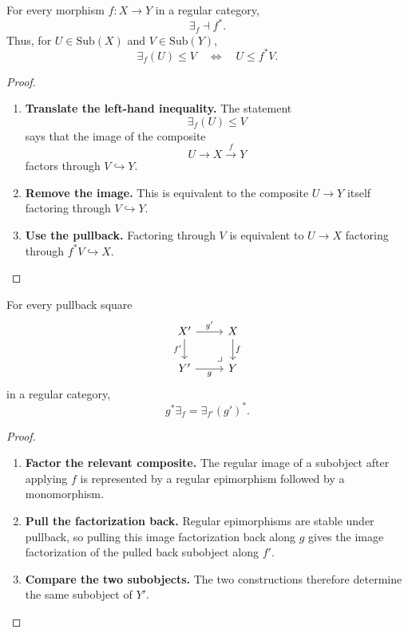 \begin{proposition}
\label{prop:relative-existential-adjunction}
For every morphism \(f:X\to Y\) in a regular category,
\[
\exists_f\dashv f^\ast.
\]
Thus, for \(U\in\mathrm{Sub}(X)\) and \(V\in\mathrm{Sub}(Y)\),
\[
\exists_f(U)\le V
\quad\Longleftrightarrow\quad
U\le f^\ast V.
\]
\end{proposition}

\begin{proof}
\leavevmode
\begin{enumerate}
\item \textbf{Translate the left-hand inequality.}
The statement
\[
\exists_f(U)\le V
\]
says that the image of the composite
\[
U\to X\xrightarrow{f}Y
\]
factors through \(V\hookrightarrow Y\).

\item \textbf{Remove the image.}
This is equivalent to the composite \(U\to Y\) itself factoring through
\(V\hookrightarrow Y\).

\item \textbf{Use the pullback.}
Factoring through \(V\) is equivalent to \(U\to X\) factoring through
\(f^\ast V\hookrightarrow X\).
\end{enumerate}
\end{proof}

\begin{proposition}
\label{prop:relative-regular-beck-chevalley}
For every pullback square
\[
\begin{tikzcd}
X' \arrow[r,"g'"] \arrow[d,"f'"']
&
X \arrow[d,"f"]
\\
Y' \arrow[r,"g"']
&
Y
\arrow[ul,phantom,very near start,"\lrcorner"]
\end{tikzcd}
\]
in a regular category,
\[
g^\ast\exists_f=\exists_{f'}(g')^\ast.
\]
\end{proposition}

\begin{proof}
\leavevmode
\begin{enumerate}
\item \textbf{Factor the relevant composite.}
The regular image of a subobject after applying \(f\) is represented by a
regular epimorphism followed by a monomorphism.

\item \textbf{Pull the factorization back.}
Regular epimorphisms are stable under pullback, so pulling this image
factorization back along \(g\) gives the image factorization of the pulled
back subobject along \(f'\).

\item \textbf{Compare the two subobjects.}
The two constructions therefore determine the same subobject of \(Y'\).
\end{enumerate}
\end{proof}

